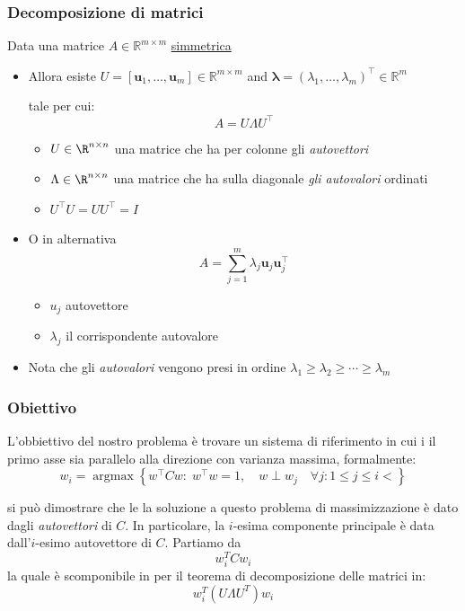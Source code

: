 \subsubsection*{Decomposizione di matrici}
Data una matrice \( A \in \mathbb{R}^{m \times m} \) \underline{simmetrica}
\begin{itemize}
	\item Allora esiste \( U = [\mathbf{u}_1, \ldots, \mathbf{u}_m] \in \mathbb{R}^{m \times m} \) and
	      \( \boldsymbol{\lambda} = (\lambda_1, \ldots, \lambda_m)^\top \in \mathbb{R}^m \)

	      tale per cui:
	      \[
		      A = U \Lambda U^\top
	      \]
	      \begin{itemize}
		      \item $ U \in \R^{n \times n} $ una matrice che ha per colonne gli \textit{autovettori}
		      \item $ \Lambda \in \R^{n \times n} $ una matrice che ha sulla diagonale \textit{gli autovalori} ordinati
		      \item $U^\top U = UU^\top = I $
	      \end{itemize}

	\item O in alternativa
	      \[
		      A = \sum_{j=1}^m \lambda_j \mathbf{u}_j \mathbf{u}_j^\top
	      \]
	      \begin{itemize}
		      \item \( u_j \) autovettore
		      \item \( \lambda_j \) il corrispondente autovalore
	      \end{itemize}

	\item Nota che gli \textit{autovalori} vengono presi in ordine
	      \( \lambda_1 \geq \lambda_2 \geq \cdots \geq \lambda_m \)
\end{itemize}
\subsubsection{Obiettivo}
L'obbiettivo del nostro problema è trovare un sistema di riferimento in cui i il primo asse sia parallelo alla direzione con varianza massima, formalmente:
\[
	w_i = \operatorname{arg max} \left\{w ^{\top} C w :\; w ^{\top}w = 1, \quad w \perp w_j \quad \forall j : 1 \le j \le i<\right\}
\]

si può dimostrare che le la soluzione a questo problema di massimizzazione è dato dagli \textit{autovettori} di $ C $. In particolare, la $ i $-esima componente principale è data dall'$ i $-esimo autovettore di $ C $.
\vskip3mm
Partiamo da
\[
	w_i^{T} C w_i
\]
la quale è scomponibile in per il teorema di decomposizione delle matrici in:
\[
	w_i^{T} \left(U \Lambda U^{T} \right) w_i
\]

